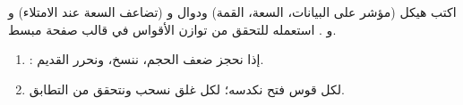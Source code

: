 \begin{statement}
اكتب هيكل  (مؤشر على البيانات، السعة، القمة) ودوال  و  (تضاعف السعة عند الامتلاء) و  و . استعمله للتحقق من توازن الأقواس في قالب صفحة  مبسط.
\end{statement}
\begin{stepsbox}\begin{enumerate}
\item {}: إذا  نحجز ضعف الحجم، ننسخ، ونحرر القديم.
\item لكل قوس فتح \code{( [ \{} نكدسه؛ لكل غلق نسحب ونتحقق من التطابق.
\end{enumerate}\end{stepsbox}
